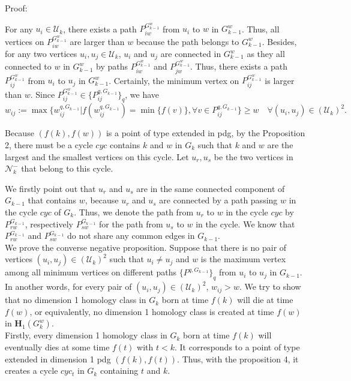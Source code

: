 \documentclass[a4paper,12pt]{article}
\numberwithin{equation}{section}
\begin{document}
	
	\noindent Proof: 
	
	For any $u_i \in \mathcal{U}_k$, there exists a path $P_{iw}^{G_{k-1}^w}$ from $u_i$ to $w$ in $G_{k-1}^w$. Thus, all vertices on $P_{iw}^{G_{k-1}^w}$ are larger than $w$ because the path belongs to $G_{k-1}^w$. Besides, for any two vertices $u_i, u_j \in \mathcal{U}_k$, $u_i$ and $u_j$ are connected in $G_{k-1}^w$ as they all connected to $w$ in $G_{k-1}^w$ by paths $P_{iw}^{G_{k-1}^w}$ and $P_{jw}^{G_{k-1}^w}$. Thus, there exists a path $P_{ij}^{G_{k-1}^w}$ from $u_i$ to $u_j$ in $G_{k-1}^w$. Certainly, the minimum vertex on $P_{ij}^{G_{k-1}^w}$ is larger than $w$. Since $P_{ij}^{G_{k-1}^w} \in \{ P_{ij}^{q,G_{k-1}} \}_q$, we have 
	$$ w_{ij} := \max \{ w_{ij}^{q,G_{k-1}} \vert f(w_{ij}^{q,G_{k-1}}) = \min \{ f(v) \}, \forall v \in P^{q,G_{k-1}}_{ij}  \} \geq w \quad \forall (u_i,u_j)\in (\mathcal{U}_k)^2.$$
	

	Because $(f(k), f(w))$ is a point of type extended in pdg, by the Proposition 2, there must be a cycle $cyc$ contains $k$ and $w$ in $G_k$ such that $k$ and $w$ are the largest and the smallest vertices on this cycle. Let $u_r,u_s$ be the two vertices in $\mathcal{N}_k^-$ that belong to this cycle. 
	
	We firstly point out that $u_r$ and $u_s$ are in the same connected component of $G_{k-1}$ that contains $w$, because $u_r$ and $u_s$ are connected by a path passing $w$ in the cycle $cyc$ of $G_k$. Thus, we denote the path from $u_r$ to $w$ in the cycle $cyc$ by $P_{rw}^{G_{k-1}}$, respectively $P_{sw}^{G_{k-1}}$ for the path from $u_s$ to $w$ in the cycle. We know that $P_{rw}^{G_{k-1}}$ and $P_{sw}^{G_{k-1}}$ do not share any common edges in $G_{k-1}$.\\
	
	We prove the converse negative proposition. Suppose that there is no pair of vertices $(u_i, u_j) \in (\mathcal{U}_k)^2$ such that $u_i \neq u_j$ and $w$ is the maximum vertex among all minimum vertices on different paths $\{ P^{q,G_{k-1}} \}_q$ from $u_i$ to $u_j$ in $G_{k-1}$. In another words, for every pair of $(u_i, u_j) \in (\mathcal{U}_k)^2$, $w_{ij} > w$. We try to show that no dimension 1 homology class in $G_k$ born at time $f(k)$ will die at time $f(w)$, or equivalently, no dimension 1 homology class is created at time $f(w)$ in $\mathbf{H}_1(G^w_k)$. \\
	

	Firstly, every dimension 1 homology class in $G_k$ born at time $f(k)$ will eventually dies at some time $f(t)$ with $t<k$. It corresponds to a point of type extended in dimension 1 pdg $(f(k),f(t))$. Thus, with the proposition 4, it creates a cycle $cyc_{t}$ in $G_k$ containing $t$ and $k$. 
	
\end{document}
